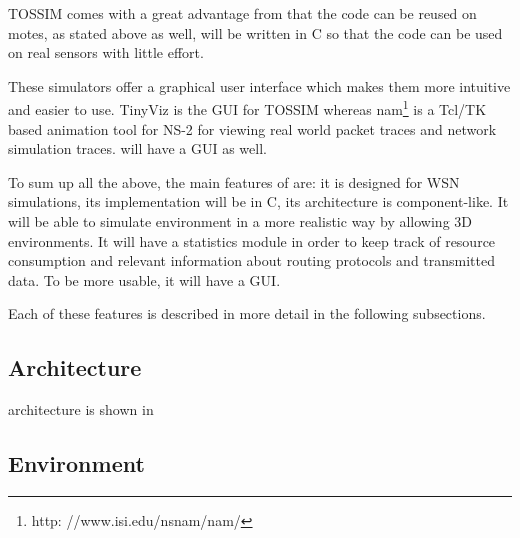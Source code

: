 TOSSIM comes with a great advantage from that the code can be reused on motes,
as stated above as well, \codename will be written in C so that the code can be
used on real sensors with little effort.   

These simulators offer a graphical user interface which makes them more intuitive
and easier to use. TinyViz is the GUI for TOSSIM whereas nam\footnote{http:
//www.isi.edu/nsnam/nam/} is a Tcl/TK based
animation tool for NS-2 for viewing real world packet traces and network simulation
traces. \codename will have a GUI as well.

To sum up all the above, the main features of \codename are: it is designed for WSN simulations, 
its implementation will be in C, its architecture is component-like. It will be able to simulate
environment in a more realistic way by allowing 3D environments. It will have a statistics module
in order to keep track of resource consumption and relevant information about routing protocols
and transmitted data. To be more usable, it will have a GUI. 

Each of these features is described in more detail in the following subsections.

\subsection{Architecture}
\codename architecture is shown in 

\subsection{Environment}

